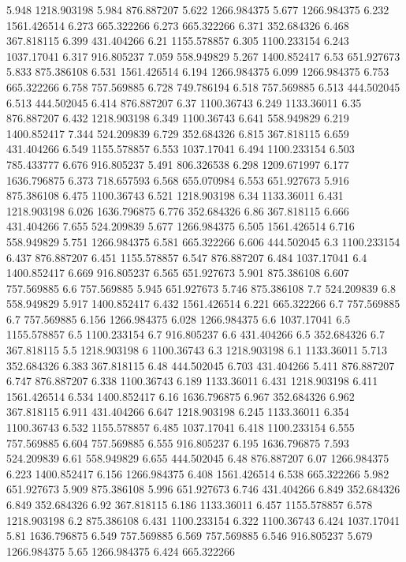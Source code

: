 5.948	1218.903198
5.984	876.887207
5.622	1266.984375
5.677	1266.984375
6.232	1561.426514
6.273	665.322266
6.273	665.322266
6.371	352.684326
6.468	367.818115
6.399	431.404266
6.21	1155.578857
6.305	1100.233154
6.243	1037.17041
6.317	916.805237
7.059	558.949829
5.267	1400.852417
6.53	651.927673
5.833	875.386108
6.531	1561.426514
6.194	1266.984375
6.099	1266.984375
6.753	665.322266
6.758	757.569885
6.728	749.786194
6.518	757.569885
6.513	444.502045
6.513	444.502045
6.414	876.887207
6.37	1100.36743
6.249	1133.36011
6.35	876.887207
6.432	1218.903198
6.349	1100.36743
6.641	558.949829
6.219	1400.852417
7.344	524.209839
6.729	352.684326
6.815	367.818115
6.659	431.404266
6.549	1155.578857
6.553	1037.17041
6.494	1100.233154
6.503	785.433777
6.676	916.805237
5.491	806.326538
6.298	1209.671997
6.177	1636.796875
6.373	718.657593
6.568	655.070984
6.553	651.927673
5.916	875.386108
6.475	1100.36743
6.521	1218.903198
6.34	1133.36011
6.431	1218.903198
6.026	1636.796875
6.776	352.684326
6.86	367.818115
6.666	431.404266
7.655	524.209839
5.677	1266.984375
6.505	1561.426514
6.716	558.949829
5.751	1266.984375
6.581	665.322266
6.606	444.502045
6.3	1100.233154
6.437	876.887207
6.451	1155.578857
6.547	876.887207
6.484	1037.17041
6.4	1400.852417
6.669	916.805237
6.565	651.927673
5.901	875.386108
6.607	757.569885
6.6	757.569885
5.945	651.927673
5.746	875.386108
7.7	524.209839
6.8	558.949829
5.917	1400.852417
6.432	1561.426514
6.221	665.322266
6.7	757.569885
6.7	757.569885
6.156	1266.984375
6.028	1266.984375
6.6	1037.17041
6.5	1155.578857
6.5	1100.233154
6.7	916.805237
6.6	431.404266
6.5	352.684326
6.7	367.818115
5.5	1218.903198
6	1100.36743
6.3	1218.903198
6.1	1133.36011
5.713	352.684326
6.383	367.818115
6.48	444.502045
6.703	431.404266
5.411	876.887207
6.747	876.887207
6.338	1100.36743
6.189	1133.36011
6.431	1218.903198
6.411	1561.426514
6.534	1400.852417
6.16	1636.796875
6.967	352.684326
6.962	367.818115
6.911	431.404266
6.647	1218.903198
6.245	1133.36011
6.354	1100.36743
6.532	1155.578857
6.485	1037.17041
6.418	1100.233154
6.555	757.569885
6.604	757.569885
6.555	916.805237
6.195	1636.796875
7.593	524.209839
6.61	558.949829
6.655	444.502045
6.48	876.887207
6.07	1266.984375
6.223	1400.852417
6.156	1266.984375
6.408	1561.426514
6.538	665.322266
5.982	651.927673
5.909	875.386108
5.996	651.927673
6.746	431.404266
6.849	352.684326
6.849	352.684326
6.92	367.818115
6.186	1133.36011
6.457	1155.578857
6.578	1218.903198
6.2	875.386108
6.431	1100.233154
6.322	1100.36743
6.424	1037.17041
5.81	1636.796875
6.549	757.569885
6.569	757.569885
6.546	916.805237
5.679	1266.984375
5.65	1266.984375
6.424	665.322266
